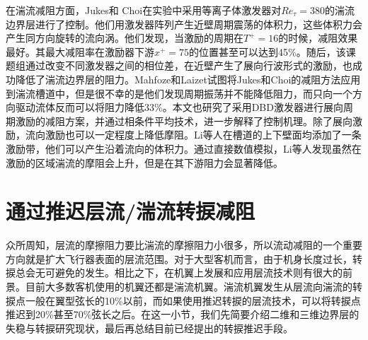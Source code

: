 在湍流减阻方面，Jukes和 Choi\cite{Jukes2006}在实验中采用等离子体激发器对$Re_\tau=380$的湍流边界层进行了控制。他们用激发器阵列产生近壁周期震荡的体积力，这些体积力会产生同方向旋转的流向涡。他们发现，当激励的周期在$T^+=16$的时候，减阻效果最好。其最大减阻率在激励器下游$x^+=75$的位置甚至可以达到45\%。随后，该课题组\cite{Choi2011,Whalley2014}通过改变不同激发器之间的相位差，在近壁产生了展向行波形式的激励，也成功降低了湍流边界层的阻力。Mahfoze和Laizet\cite{Mahfoze2017}试图将Jukes和Choi的减阻方法应用到湍流槽道中，但是很不幸的是他们发现周期振荡并不能降低阻力，而只向一个方向驱动流体反而可以将阻力降低33\%。本文也研究了采用DBD激发器进行展向周期激励的减阻方案，并通过相条件平均技术，进一步解释了控制机理。除了展向激励，流向激励也可以一定程度上降低摩阻。Li等人\cite{LiZX2015}在槽道的上下壁面均添加了一条激励带，他们可以产生沿着流向的体积力。通过直接数值模拟，Li等人发现虽然在激励的区域湍流的摩阻会上升，但是在其下游阻力会显著降低。

\section{通过推迟层流/湍流转捩减阻}
\label{sec:first}
众所周知，层流的摩擦阻力要比湍流的摩擦阻力小很多，所以流动减阻的一个重要方向就是扩大飞行器表面的层流范围。对于大型客机而言，由于机身长度过长，转捩总会无可避免的发生。相比之下，在机翼上发展和应用层流技术则有很大的前景。目前大多数客机使用的机翼还都是湍流机翼。湍流机翼发生从层流向湍流的转捩点一般在翼型弦长的10\%以前，而如果使用推迟转捩的层流技术，可以将转捩点推迟到20\%甚至70\%弦长之后。在这一小节，我们先简要介绍二维和三维边界层的失稳与转捩研究现状，最后再总结目前已经提出的转捩推迟手段。

